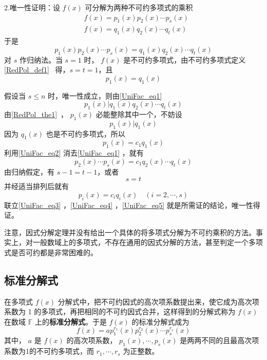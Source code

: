  2.唯一性证明：设 $f(x)$ 可分解为两种不可约多项式的乘积
 \begin{equation}
 \begin{aligned}
 &f(x)=p_1(x)p_2(x)\cdots p_s(x)\\
 &f(x)=q_1(x)q_2(x)\cdots q_t(x)
 \end{aligned}
 \end{equation}
 于是
 \begin{equation}\label{UniFac_eq1}
 p_1(x)p_2(x)\cdots p_s(x)=q_1(x)q_2(x)\cdots q_t(x)
 \end{equation}
 对 $s$ 作归纳法。当 $s=1$ 时， $f(x)$ 是不可约多项式，由不可约多项式定义\autoref{RedPol_def1}~ 得，$s=t=1$，且
 \begin{equation}
 p_1(x)=q_1(x)
 \end{equation}
 
 假设当 $s\leq n$ 时，唯一性成立，则由\autoref{UniFac_eq1} 
 \begin{equation}
 p_1(x)|q_1(x)q_2(x)\cdots q_t(x)
 \end{equation}
 由\autoref{RedPol_the1}~， $p_1(x)$ 必能整除其中一个，不妨设
 \begin{equation}
 p_1(x)|q_1(x)
 \end{equation}
 因为 $q_1(x)$ 也是不可约多项式，所以
 \begin{equation}\label{UniFac_eq2}
 p_1(x)=c_1q_1(x)
 \end{equation}
 利用\autoref{UniFac_eq2} 消去\autoref{UniFac_eq1} ，就有
 \begin{equation}\label{UniFac_eq3}
 p_2(x)\cdots p_s(x)=c_1q_2(x)\cdots q_t(x)
 \end{equation}
 由归纳假定，有 $s-1=t-1$，或者
 \begin{equation}\label{UniFac_eq4}
 s=t
 \end{equation}
 并经适当排列后就有
 \begin{equation}\label{UniFac_eq5}
 p_i(x)=c_iq_i(x)\quad (i=2,\cdots,s)
 \end{equation}
 联立\autoref{UniFac_eq3} ，\autoref{UniFac_eq4} ，\autoref{UniFac_eq5} 就是所需证的结论，唯一性得证。

注意，因式分解定理并没有给出一个具体的将多项式分解为不可约乘积的方法。事实上，对一般数域上的多项式，不存在通用的因式分解的方法，甚至判定一个多项式是否可约都是非常困难的。
\subsection{标准分解式}
在多项式 $f(x)$ 分解式中，把不可约因式的高次项系数提出来，使它成为高次项系数为 1 的多项式，再把相同的不可约因式合并，这样得到的分解式称为 $f(x)$ 在数域 $\mathbb{F}$ 上的\textbf{标准分解式}。于是 $f(x)$ 的标准分解式成为
\begin{equation}
f(x)=ap_1^{r_1}(x)p_2^{r_2}(x)\cdots p_s^{r_s}(x)
\end{equation}
其中， $a$ 是 $f(x)$ 的高次项系数， $p_1(x),\cdots,p_s(x)$ 是两两不同的且最高次项系数为1的不可约多项式，而 $r_1,\cdots ,r_s$ 为正整数。

